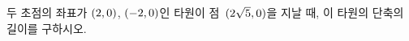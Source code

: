 두 초점의 좌표가 $(2{,}\mkern3mu\mathopen{}0)$, $(-2{,}\mkern3mu\mathopen{}0)$인 타원이 점~$(2\sqrt{5}{,}\mkern3mu\mathopen{}0)$을 지날 때, 이 타원의 단축의 길이를 구하시오.
